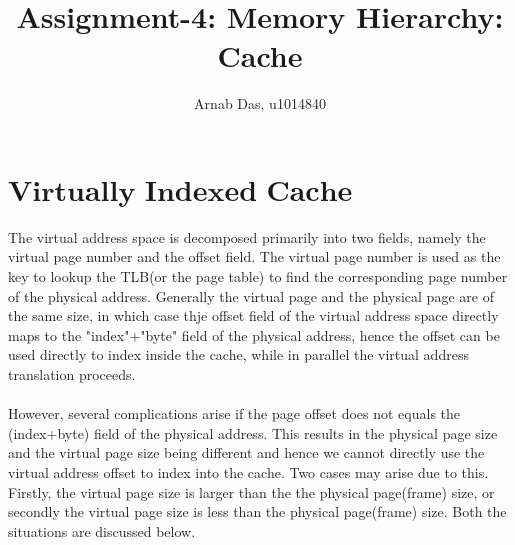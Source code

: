 \documentclass{tufte-handout}
\title{Assignment-4: Memory Hierarchy: Cache}
\author[]{Arnab Das, u1014840}
\begin{document}
  
  \maketitle%
  

 \setcounter{secnumdepth}{1}

\newpage

	\section{$\textbf{Virtually Indexed Cache}$}
		The virtual address space is decomposed primarily into two fields, namely the virtual page number and the offset field. The virtual page number is used as the key to lookup the TLB(or the page table) to find the corresponding page number of the physical address. Generally the virtual page and the physical page are of the same size, in which case thje offset field of the virtual address space directly maps to the "index"+"byte" field of the physical address, hence the offset can be used directly to index inside the cache, while in parallel the virtual address translation proceeds.
		\paragraph{} However, several complications arise if the page offset does not equals the (index+byte) field of the physical address. This results in the physical page size and the virtual page size being different and hence we cannot directly use the virtual address offset to index into the cache. Two cases may arise due to this. Firstly, the virtual page size is larger than the the physical page(frame) size, or secondly the virtual page size is less than the physical page(frame) size. Both the situations are discussed below.
\end{document}
